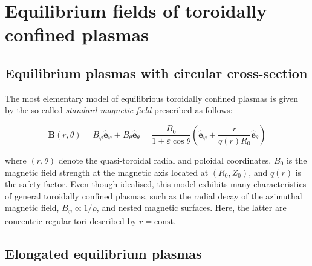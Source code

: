 \section{Equilibrium fields of toroidally confined plasmas}

\subsection{Equilibrium plasmas with circular cross-section}

The most elementary model of equilibrious toroidally confined plasmas is given by the so-called \textit{standard magnetic field} prescribed as follows:

\begin{equation}
    \mathbf{B}(r,\theta)=B_\varphi\mathbf{\hat{e}}_\varphi+B_\theta\mathbf{\hat{e}}_\theta=\frac{B_0}{1+\varepsilon\cos{\theta}}\left(\mathbf{\hat{e}}_\varphi+\frac{r}{q(r)R_0}\mathbf{\hat{e}}_\theta\right)
\end{equation}

where $(r,\theta)$ denote the quasi-toroidal radial and poloidal coordinates, $B_0$ is the magnetic field strength at the magnetic axis located at $(R_0, Z_0)$, and $q(r)$ is the safety factor. Even though idealised, this model exhibits many characteristics of general toroidally confined plasmas, such as the radial decay of the azimuthal magnetic field, $B_\varphi\propto1/\rho$, and nested magnetic surfaces. Here, the latter are concentric regular tori described by $r=\text{const}$.

\subsection{Elongated equilibrium plasmas}